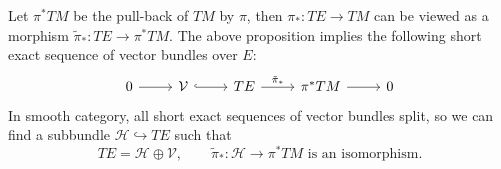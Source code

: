 Let $\pi^*TM$ be the pull-back of $TM$ by $\pi$, then $\pi_*: TE \to TM$ can be viewed as 
a morphism $\tilde{\pi}_*: TE \to \pi^* TM$. 
The above proposition implies the following short exact sequence of vector bundles over $E$:
\[\begin{tikzcd}
    0 & \mathcal{V} & TE & {\pi^*TM} & 0
    \arrow[from=1-1, to=1-2]
    \arrow[hook, from=1-2, to=1-3]
    \arrow["\tilde{\pi}_*", from=1-3, to=1-4]
    \arrow[from=1-4, to=1-5]
\end{tikzcd}\]
In smooth category, all short exact sequences of vector bundles split, 
so we can find a subbundle $\mathcal{H}\hookrightarrow TE$ such that 
\begin{equation*}
    TE = \mathcal{H} \oplus \mathcal{V}, \qquad \tilde{\pi}_*: \mathcal{H} \to \pi^* TM \text{ is an isomorphism}.
\end{equation*}

